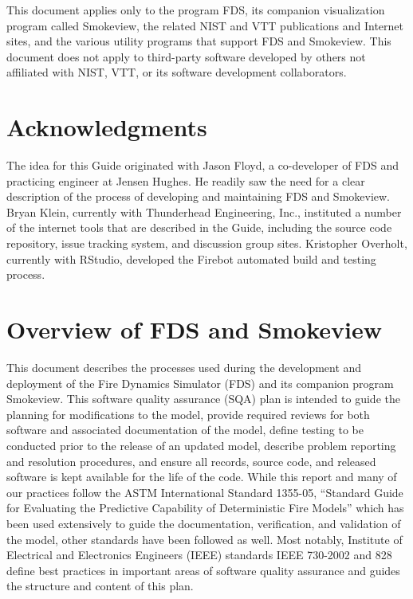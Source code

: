 \documentclass[11pt]{book}
\begin{document}
This document applies only to the program FDS, its companion visualization program called Smokeview,  the related NIST and VTT publications and Internet
sites, and the various utility programs that support FDS and Smokeview. This document does not apply to third-party software developed by others
not affiliated with NIST, VTT, or its software development collaborators.





\chapter{Acknowledgments}

\label{acksection}

The idea for this Guide originated with Jason Floyd, a co-developer of FDS and practicing engineer at Jensen Hughes. He readily saw the need for a clear description of the process of developing and maintaining FDS and Smokeview. Bryan Klein, currently with Thunderhead Engineering, Inc., instituted a number of the internet tools that are described in the Guide, including the source code repository, issue tracking system, and discussion group sites. Kristopher Overholt, currently with RStudio, developed the Firebot automated build and testing process. 


\newpage

\tableofcontents

\mainmatter


\chapter{Overview of FDS and Smokeview}

This document describes the processes used during the development and deployment of the Fire Dynamics Simulator (FDS) and its companion program Smokeview.  This software quality assurance (SQA) plan is intended to guide the planning for modifications to the model, provide required reviews for both software and associated documentation of the model, define testing to be conducted prior to the release of an updated model, describe problem reporting and resolution procedures, and ensure all records, source code, and released software is kept available for the life of the code.  While this report and many of our practices follow the ASTM International Standard 1355-05, ``Standard Guide for Evaluating the Predictive Capability of Deterministic Fire Models'' \cite{ASTM:E1355} which has been used extensively to guide the documentation, verification, and validation of the model, other standards have been followed as well.  Most notably, Institute of Electrical and Electronics Engineers (IEEE) standards IEEE 730-2002 \cite{IEEE:730} and 828~\cite{IEEE-828} define best practices in important areas of software quality assurance and guides the structure and content of this plan.
\end{document}
